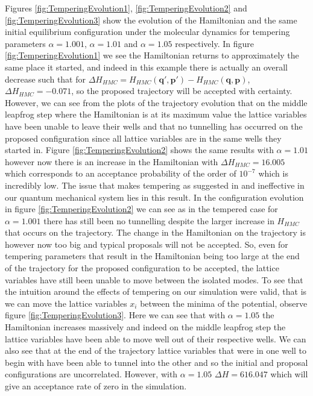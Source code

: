 \documentclass[12pt]{article}
\begin{document}
Figures \ref{fig:TemperingEvolution1}, \ref{fig:TemperingEvolution2} and \ref{fig:TemperingEvolution3} show the evolution of the Hamiltonian and the same initial equilibrium configuration under the molecular dynamics for tempering parameters $\alpha=1.001$, $\alpha=1.01$ and $\alpha=1.05$ respectively. In figure \ref{fig:TemperingEvolution1} we see the Hamiltonian returns to approximately the same place it started, and indeed in this example there is actually an overall decrease such that for $\Delta H_{HMC} = H_{HMC}\left(\bm{q}',\bm{p}'\right)-H_{HMC}\left(\bm{q},\bm{p}\right)$, $\Delta H_{HMC} = -0.071$, so the proposed trajectory will be accepted with certainty. However, we can see from the plots of the trajectory evolution that on the middle leapfrog step where the Hamiltonian is at its maximum value the lattice variables have been unable to leave their wells and that no tunnelling has occurred on the proposed configuration since all lattice variables are in the same wells they started in. Figure \ref{fig:TemperingEvolution2} shows the same results with $\alpha=1.01$ however now there is an increase in the Hamiltonian with $\Delta H_{HMC} = 16.005$ which corresponds to an acceptance probability of the order of $10^{-7}$ which is incredibly low. The issue that makes tempering as suggested in \cite{neal_2011} and \cite{neal_1996_b} ineffective in our quantum mechanical system lies in this result. In the configuration evolution in figure \ref{fig:TemperingEvolution2} we can see as in the tempered case for $\alpha=1.001$ there has still been no tunnelling despite the larger increase in $H_{HMC}$ that occurs on the trajectory. The change in the Hamiltonian on the trajectory is however now too big and typical proposals will not be accepted. So, even for tempering parameters that result in the Hamiltonian being too large at the end of the trajectory for the proposed configuration to be accepted, the lattice variables have still been unable to move between the isolated modes. To see that the intuition around the effects of tempering on our simulation were valid, that is we can move the lattice variables $x_i$ between the minima of the potential, observe figure \ref{fig:TemperingEvolution3}. Here we can see that with $\alpha=1.05$ the Hamiltonian increases massively and indeed on the middle leapfrog step the lattice variables have been able to move well out of their respective wells. We can also see that at the end of the trajectory lattice variables that were in one well to begin with have been able to tunnel into the other and so the initial and proposal configurations are uncorrelated. However, with $\alpha=1.05$ $\Delta H = 616.047$ which will give an acceptance rate of zero in the simulation. 
\end{document}
